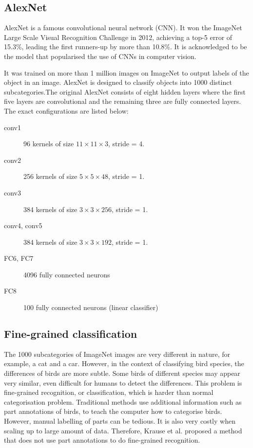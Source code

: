 \documentclass[letterpaper, 12pt]{article}
\begin{document}
\subsection{AlexNet}
AlexNet \cite{Alex} is a famous convolutional neural network (CNN). It won the ImageNet Large Scale
Visual Recognition Challenge in 2012, achieving a top-5 error of 15.3\%, leading the first runners-up
by more than 10.8\%. It is acknowledged to be the model that popularised the use of CNNs in computer vision.

It was trained on more than 1 million images on ImageNet to output labels of the object in an image. AlexNet
is designed to classify objects into 1000 distinct subcategories.The original AlexNet consists of eight hidden layers where the first five
layers are convolutional and the remaining three are fully connected layers. The exact configurations
are listed below:
\begin{description}
	\item [conv1] 96 kernels of size $11 \times 11 \times 3$, stride = 4.
	\item [conv2] 256 kernels of size $5 \times 5 \times 48$, stride = 1.
	\item [conv3] 384 kernels of size $3 \times 3 \times 256$, stride = 1.
	\item [conv4, conv5] 384 kernels of size $3 \times 3 \times 192$, stride = 1.
	\item [FC6, FC7] 4096 fully connected neurons
    \item [FC8] 100 fully connected neurons (linear classifier)
\end{description}

\subsection{Fine-grained classification}
The 1000 subcategories of ImageNet images are very different in nature, for example, a cat and a car.
However, in the context of classifying bird species, the differences of birds are more subtle. Some
birds of different species may appear very similar, even difficult for humans to detect the differences.
This problem is fine-grained recognition, or classification, which is harder than normal categorisation problem.
Traditional methods use additional information such as part annotations of birds, to teach the computer how to
categorise birds. However, manual labelling of parts can be tedious. It is also very costly when scaling up to
large amount of data. Therefore, Krause et al. \cite{krause2015fine} proposed a method that does not use part annotations
to do fine-grained recognition.
\end{document}
